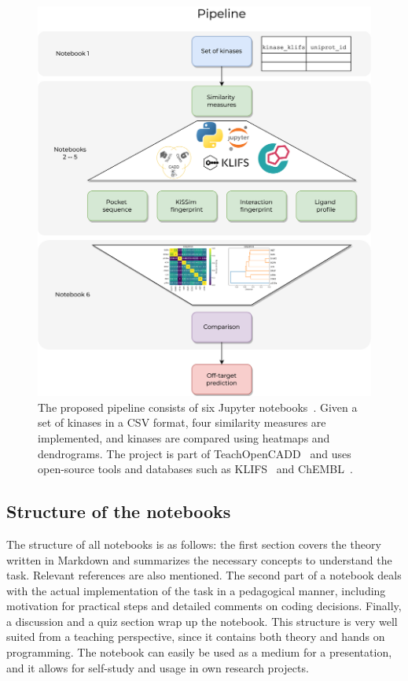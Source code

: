 \documentclass[9pt,training]{livecoms}
\begin{document}
\begin{figure}[ht]
    \centering
    \includegraphics[width=\columnwidth]{Pipeline.png}
    \caption{The proposed pipeline consists of six Jupyter notebooks~\cite{Kluyver_2016_Jupyter}. Given a set of kinases in a CSV format, four similarity measures are implemented, and kinases are compared using heatmaps and dendrograms. The project is part of TeachOpenCADD~\cite{Sydow_2019_JCheminform, sydow_2022_nar} and uses open-source tools and databases such as KLIFS~\cite{Kanev_2020_NAR} and ChEMBL~\cite{Gaulton_2016_nar}.}
    \label{fig:pipeline}
\end{figure}

\subsection{Structure of the notebooks}
The structure of all notebooks is as follows: the first section covers the theory written in Markdown and summarizes the necessary concepts to understand the task. Relevant references are also mentioned. The second part of a notebook deals with the actual implementation of the task in a pedagogical manner, including motivation for practical steps and detailed comments on coding decisions. Finally, a discussion and a quiz section wrap up the notebook.
This structure is very well suited from a teaching perspective, since it contains both theory and hands on programming. The notebook can easily be used as a medium for a presentation, and it allows for self-study and usage in own research projects.
\end{document}
